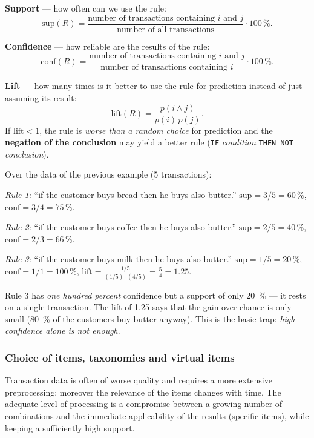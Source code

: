 \documentclass[11pt,a4paper]{article}
\theoremstyle{definition}
\providecommand{\uv}[1]{``#1''}
\begin{document}
\begin{defbox}
\textbf{Support} --- how often can we use the rule:
\[ \mathrm{sup}(R)=\frac{\text{number of transactions containing } i \text{ and } j}
   {\text{number of all transactions}}\cdot 100\,\%. \]

\textbf{Confidence} --- how reliable are the results of the rule:
\[ \mathrm{conf}(R)=\frac{\text{number of transactions containing } i \text{ and } j}
   {\text{number of transactions containing } i}\cdot 100\,\%. \]

\textbf{Lift} --- how many times is it better to use the rule for prediction instead of just
assuming its result:
\[ \mathrm{lift}(R)=\frac{p(i\wedge j)}{p(i)\,p(j)}. \]
If $\mathrm{lift}<1$, the rule is \emph{worse than a random choice} for prediction and the
\textbf{negation of the conclusion} may yield a better rule (\texttt{IF} \emph{condition}
\texttt{THEN NOT} \emph{conclusion}).
\end{defbox}

\begin{defbox}
Over the data of the previous example (5 transactions):

\emph{Rule 1:} \uv{if the customer buys bread then he buys also butter.}
$\mathrm{sup}=3/5=60\,\%$, $\mathrm{conf}=3/4=75\,\%$.

\emph{Rule 2:} \uv{if the customer buys coffee then he buys also butter.}
$\mathrm{sup}=2/5=40\,\%$, $\mathrm{conf}=2/3=66\,\%$.

\emph{Rule 3:} \uv{if the customer buys milk then he buys also butter.}
$\mathrm{sup}=1/5=20\,\%$, $\mathrm{conf}=1/1=100\,\%$,
$\mathrm{lift}=\frac{1/5}{(1/5)\cdot(4/5)}=\frac54=1.25$.

Rule 3 has \emph{one hundred percent} confidence but a support of only 20~\% --- it rests on a
single transaction. The lift of 1.25 says that the gain over chance is only small (80~\% of the
customers buy butter anyway). This is the basic trap: \emph{high confidence alone is not enough}.
\end{defbox}

\subsubsection{Choice of items, taxonomies and virtual items}

Transaction data is often of worse quality and requires a more extensive preprocessing; moreover
the relevance of the items changes with time. The adequate level of processing is a compromise
between a growing number of combinations and the immediate applicability of the results (specific
items), while keeping a sufficiently high support.
\end{document}

